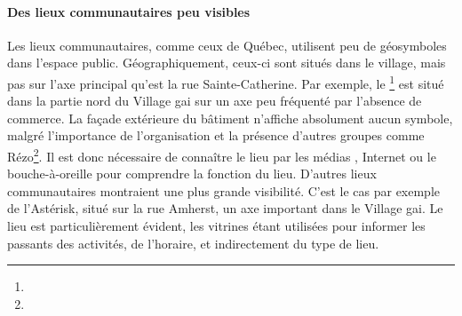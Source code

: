 \paragraph{Des lieux communautaires peu visibles}
Les lieux communautaires, comme ceux de Québec, utilisent peu de géosymboles dans l'espace public.
Géographiquement, ceux-ci sont situés dans le village, mais pas sur l'axe principal qu'est la rue Sainte-Catherine.
Par exemple, le \ccglm{}\footnote{} est situé dans la partie nord du Village gai sur un axe peu fréquenté par l'absence de commerce.
La façade extérieure du bâtiment n'affiche absolument aucun symbole, malgré l'importance de l'organisation et la présence d'autres groupes \lgbt{} comme Rézo\footnote{}.
Il est donc nécessaire de connaître le lieu par les médias \lgbt{}, Internet ou le bouche-à-oreille pour comprendre la fonction du lieu.
D'autres lieux communautaires montraient une plus grande visibilité.
C'est le cas par exemple de l'Astérisk, situé sur la rue Amherst, un axe important dans le Village gai.
Le lieu est particulièrement évident, les vitrines étant utilisées pour informer les passants des activités, de l'horaire, et indirectement du type de lieu.

